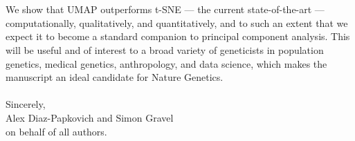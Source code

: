 \documentclass{article}
\begin{document}
\\\\
We show that UMAP outperforms t-SNE --- the current state-of-the-art --- computationally, qualitatively, and quantitatively, and to such an extent that we expect it to become a standard companion to principal component analysis. This will be useful and of interest to a broad variety of geneticists in population genetics, medical genetics, anthropology, and data science, which makes the manuscript an ideal candidate for Nature Genetics.
\\
\\
Sincerely,
\\
Alex Diaz-Papkovich and Simon Gravel
\\
on behalf of all authors.
\end{document}
